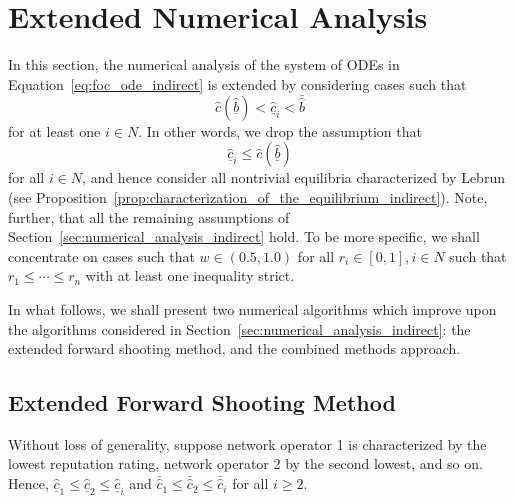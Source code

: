 \section{Extended Numerical Analysis} %
\label{sec:extended_numerical_analysis_indirect}
In this section, the numerical analysis of the system of ODEs in Equation~\eqref{eq:foc_ode_indirect} is extended by considering cases such that
\begin{equation*}
  \hat{c}(\underline{\hat{b}}) < \underline{\hat{c}}_i < \bar{\hat{b}}
\end{equation*}
for at least one $i\in N$. In other words, we drop the assumption that
\begin{equation*}
  \underline{\hat{c}}_i \leq \hat{c}(\underline{\hat{b}})
\end{equation*}
for all $i\in N$, and hence consider all nontrivial equilibria characterized by Lebrun~\cite{Lebrun2006} (see Proposition~\ref{prop:characterization_of_the_equilibrium_indirect}). Note, further, that all the remaining assumptions of Section~\ref{sec:numerical_analysis_indirect} hold. To be more specific, we shall concentrate on cases such that $w\in (0.5,1.0)$ for all $r_i\in[0,1], i\in N$ such that $r_1\leq\cdots\leq r_n$ with at least one inequality strict.

In what follows, we shall present two numerical algorithms which improve upon the algorithms considered in Section~\ref{sec:numerical_analysis_indirect}: the extended forward shooting method, and the combined methods approach.

\subsection{Extended Forward Shooting Method} %
\label{sub:extended_forward_shooting_method_indirect}
Without loss of generality, suppose network operator 1 is characterized by the lowest reputation rating, network operator 2 by the second lowest, and so on. Hence, $\underline{\hat{c}}_1\leq \underline{\hat{c}}_2\leq \underline{\hat{c}}_i$ and $\bar{\hat{c}}_1\leq \bar{\hat{c}}_2\leq \bar{\hat{c}}_i$ for all $i\geq 2$.

